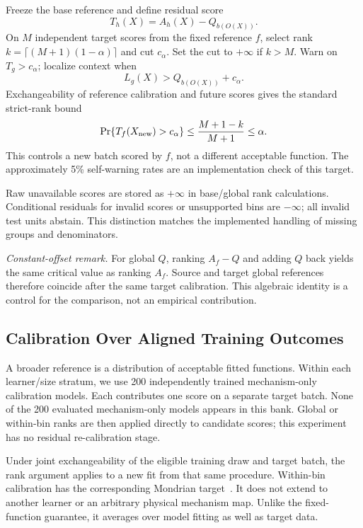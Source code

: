 \documentclass[conference]{IEEEtran}
\begin{document}
Freeze the base reference and define residual score
\begin{equation}
 T_h(X)=A_h(X)-Q_{b(O(X))}.
\end{equation}
On $M$ independent target scores from the fixed reference $f$, select rank $k=\lceil(M+1)(1-\alpha)\rceil$ and cut $c_\alpha$. Set the cut to $+\infty$ if $k>M$. Warn on $T_g>c_\alpha$; localize context when
\begin{equation}
 L_g(X)>Q_{b(O(X))}+c_\alpha.
 \label{eq:localization}
\end{equation}
Exchangeability of reference calibration and future scores gives the standard strict-rank bound
\begin{equation}
 \Pr\{T_f(X_{\rm new})>c_\alpha\}\leq\frac{M+1-k}{M+1}\leq\alpha.
 \label{eq:rank}
\end{equation}
This controls a new batch scored by $f$, not a different acceptable function. The approximately 5\% self-warning rates are an implementation check of this target.

Raw unavailable scores are stored as $+\infty$ in base/global rank calculations. Conditional residuals for invalid scores or unsupported bins are $-\infty$; all invalid test units abstain. This distinction matches the implemented handling of missing groups and denominators.

\textit{Constant-offset remark.} For global $Q$, ranking $A_f-Q$ and adding $Q$ back yields the same critical value as ranking $A_f$. Source and target global references therefore coincide after the same target calibration. This algebraic identity is a control for the comparison, not an empirical contribution.

\subsection{Calibration Over Aligned Training Outcomes}
A broader reference is a distribution of acceptable fitted functions. Within each learner/size stratum, we use 200 independently trained mechanism-only calibration models. Each contributes one score on a separate target batch. None of the 200 evaluated mechanism-only models appears in this bank. Global or within-bin ranks are then applied directly to candidate scores; this experiment has no residual re-calibration stage.

Under joint exchangeability of the eligible training draw and target batch, the rank argument applies to a new fit from that same procedure. Within-bin calibration has the corresponding Mondrian target~\cite{vovk2005algorithmic,vovk2012conditional}. It does not extend to another learner or an arbitrary physical mechanism map. Unlike the fixed-function guarantee, it averages over model fitting as well as target data.
\end{document}

